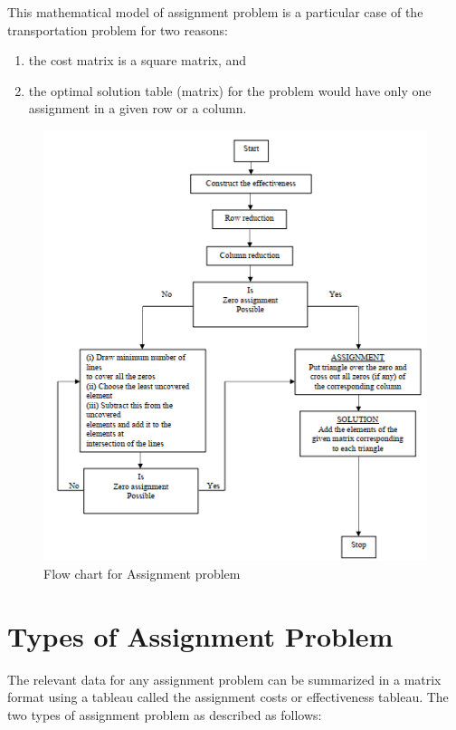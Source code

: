 \documentclass[11pt]{report}
\newcommand{\NI}{\noindent}
\renewcommand{\labelenumi}{\arabic{enumi})}
\begin{document}
	\NI This mathematical model of assignment problem is a particular case of the transportation
	problem for two reasons: 
	\begin{enumerate}
		\renewcommand{\labelenumi}{(\roman{enumi})}
		\item the cost matrix is a square matrix, and
		\item the optimal solution table (matrix) for the problem would have only one assignment in a given row or a column.
	\end{enumerate}
	
	\begin{figure}[!h]
		\centering
		\includegraphics[width=1.02\linewidth]{mt}
		\caption{Flow chart for Assignment problem}
	\end{figure}
	\newpage
	\section{Types of Assignment Problem}
	The relevant data for any assignment problem can be summarized in a matrix format using a tableau called the assignment costs or effectiveness tableau. The two types of assignment problem as described as follows:
	
\end{document}
